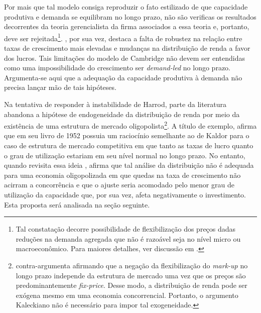 Por mais que tal modelo consiga reproduzir o fato estilizado de que capacidade produtiva e demanda se equilibram no longo prazo, não são verificas os resultados decorrentes da teoria gerencialista da firma associados a essa teoria e, portanto, deve ser rejeitada\footnote{Tal constatação decorre possibilidade de flexibilização dos preços dadas reduções na demanda agregada que não é razoável seja no nível micro ou macroeconômico. Para maiores detalhes, ver discussão em \textcites[p.~104--5, n. 17]{serrano_teoria_1988}[Original de 1986]{ciccone_2017}.}. \textcite[p.~158]{cesaratto_neo-kaleckian_2015}, por sua vez, destaca a falta de robustez na relação entre taxas de crescimento mais elevadas e mudanças na distribuição de renda a favor dos lucros.
Tais limitações do modelo de Cambridge não devem ser entendidas como uma impossibilidade do crescimento ser \textit{demand-led} no longo prazo. Argumenta-se aqui que a adequação da capacidade produtiva à demanda não precisa lançar mão de tais hipóteses. 

Na tentativa de responder à instabilidade de Harrod, parte da literatura abandona a hipótese de endogeneidade da distribuição de renda por meio da existência de uma estrutura de mercado oligopolista\footnote{\textcite{serrano_sraffian_1995} contra-argumenta afirmando que a negação da flexibilização do \textit{mark-up} no longo prazo independe da estrutura de mercado uma vez que os preços são predominantemente \textit{fix-price}. Desse modo, a distribuição de renda pode ser exógena mesmo em uma economia concorrencial. Portanto, o argumento Kaleckiano não é necessário para impor tal exogeneidade.}. A título de exemplo, \citeauthor*{steindl_maturity_1952} afirma que em seu livro de 1952 \cite{steindl_maturity_1952} possuia um raciocínio semelhante ao de Kaldor para o caso de estrutura de mercado competitiva em que tanto as taxas de lucro quanto o grau de utilização estariam em seu nível normal no longo prazo. No entanto, quando revisita essa ideia \cite{steindl_stagnation_1979}, afirma que tal análise da distribuição não é adequada para uma economia oligopolizada  em que quedas na taxa de crescimento não acirram a concorrência e que o ajuste seria acomodado pelo menor grau de utilização da capacidade que, por sua vez, afeta negativamente o investimento. Esta proposta será analisada na seção seguinte.


